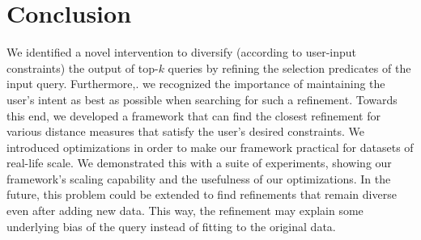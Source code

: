 \section{Conclusion}
\label{sec:conclusion}

We identified a novel intervention to diversify (according to user-input constraints) the output of top-$k$ queries by refining the selection predicates of the input query. Furthermore,. we recognized the importance of maintaining the user's intent as best as possible when searching for such a refinement. Towards this end, we developed a framework that can find the closest refinement for various distance measures that satisfy the user's desired constraints. 
We introduced optimizations in order to make our framework practical for datasets of real-life scale. We demonstrated this with a suite of experiments, showing our framework's scaling capability and the usefulness of our optimizations. In the future, this problem could be extended to find refinements that remain diverse even after adding new data. This way, the refinement may explain some underlying bias of the query instead of fitting to the original data.  


